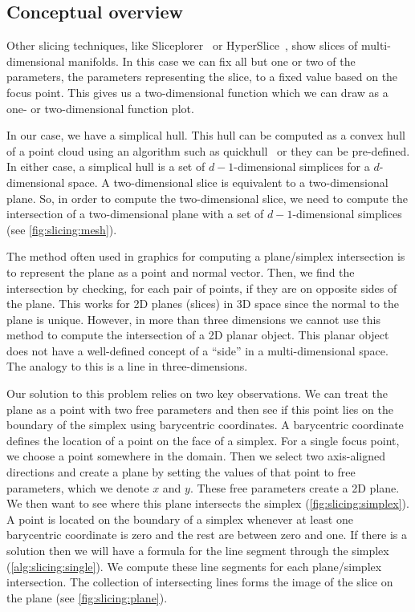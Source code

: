 \subsection{Conceptual overview}

Other slicing techniques, like Sliceplorer~\cite{Torsney-Weir:2017a} or
HyperSlice~\cite{Wijk:1993}, show slices of multi-dimensional manifolds.
In this case we can fix all but one or two of the
parameters, the parameters representing the slice, to a fixed value based on the
focus point. This gives us a two-dimensional function which we can draw as
a one- or two-dimensional function plot.

In our case, we have a simplical hull. This hull can be computed as a convex
hull of a point cloud using an algorithm such as quickhull~\cite{Barber:1996}
or they can be pre-defined.  In either case, a simplical hull is a set of
\(d-1\)-dimensional simplices for a \(d\)-dimensional space. 
A two-dimensional
slice is equivalent to a two-dimensional plane. So, in order to compute the
two-dimensional slice, we need to compute the intersection of a two-dimensional
plane with a set of \(d-1\)-dimensional simplices 
(see \autoref{fig:slicing:mesh}). 

The method often used in graphics for
computing a plane/simplex intersection is to represent the plane as a point and
normal vector. Then, we find the intersection by checking, for each pair of
points, if they are on opposite sides of the plane.
This works for 2D planes (slices) in 3D space
since the normal to the plane is unique. However, in more than three dimensions
we cannot use this method to compute the intersection of a 2D planar object.
This planar object does not have a well-defined concept of a ``side'' in a
multi-dimensional space. The analogy to this is a line in three-dimensions.

Our solution to this problem relies on two key observations. We can treat the
plane as a point with two free parameters and then see if
this point lies on the boundary of the simplex using barycentric coordinates.
A barycentric coordinate defines the location of a point on the face of a simplex.
For a single focus point, we choose a point somewhere in the domain. Then we
select two axis-aligned directions and create a plane by setting the values
of that point to free parameters, which we denote $x$ and $y$. These free parameters
create a 2D plane. We then want to see where this plane intersects the simplex
(\autoref{fig:slicing:simplex}). 
A point is located on the boundary of a simplex whenever at least one
barycentric coordinate is zero and the rest are between zero and one. 
If there is a solution then we will have a formula for the line segment
through the simplex (\autoref{alg:slicing:single}).
We compute these line segments for each plane/simplex intersection. The
collection of intersecting lines forms the image of the slice on the plane
(see \autoref{fig:slicing:plane}).

